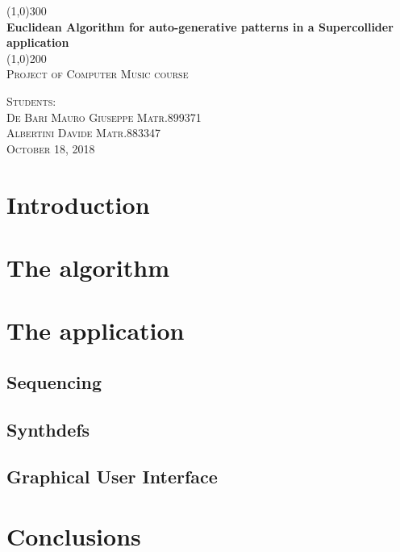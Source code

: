 \documentclass[a4paper]{article}
\begin{document}
\begin{titlepage}
	\begin{center}
	\line(1,0){300}\\
	[0.25in]
	\huge{\bfseries Euclidean Algorithm for auto-generative patterns in a Supercollider application}\\
	[2mm]
	\line(1,0){200}\\
	[1.5cm]
	\textsc{\LARGE Project of Computer Music course}\\
	[10.75cm]
	\end{center}
	\begin{flushright}
	\textsc{\large  Students:\\
	De Bari Mauro Giuseppe Matr.899371 \\
	Albertini Davide Matr.883347\\
	October 18, 2018 \\}
	\end{flushright}
\end{titlepage}

\tableofcontents
\newpage

\section{Introduction}


\section{The algorithm}

\section{The application}
\subsection{Sequencing}

\subsection{Synthdefs}

\subsection{Graphical User Interface}

\section{Conclusions}


\end{document}
